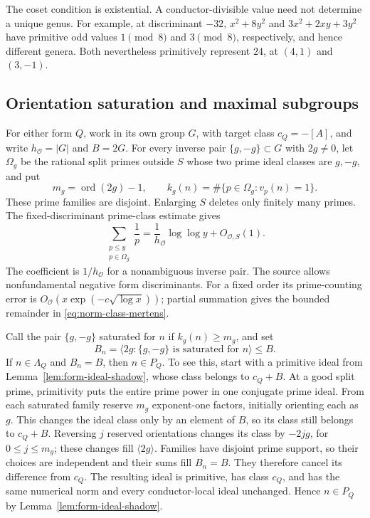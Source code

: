 The coset condition is existential. A conductor-divisible value need
not determine a unique genus. For example, at discriminant \(-32\),
\(x^2+8y^2\) and \(3x^2+2xy+3y^2\) have primitive odd values
\(1\pmod8\) and \(3\pmod8\), respectively, and hence different
genera. Both nevertheless primitively represent \(24\), at
\((4,1)\) and \((3,-1)\).

\subsection{Orientation saturation and maximal subgroups}

For either form \(Q\), work in its own group \(G\), with target
class \(c_Q=-[A]\), and write $h_{\mathcal O}=|G|$ and $B=2G$. For every inverse pair
$\{g,-g\}\subset G$ with $2g\ne0$, let
$\Omega_g$ be the rational split primes outside $S$ whose two prime
ideal classes are $g,-g$, and put
\[
 m_g=\operatorname{ord}(2g)-1,\qquad
 k_g(n)=\#\{p\in\Omega_g:v_p(n)=1\}.
\]
These prime families are disjoint. Enlarging \(S\) deletes only
finitely many primes. The fixed-discriminant prime-class
estimate \cite[Lemma~2, equation~(5.2)]{bourgainfuchs} gives
\begin{equation}\label{eq:norm-class-mertens}
 \sum_{\substack{p\le y\\p\in\Omega_g}}\frac1p
                =\frac1h_{\mathcal O}\log\log y+O_{\mathcal O,S}(1).
\end{equation}
The coefficient is $1/h_{\mathcal O}$ for a nonambiguous inverse pair.  The source
allows nonfundamental negative form discriminants.  For a fixed order
its prime-counting error is $O_{\mathcal O}(x\exp(-c\sqrt{\log x}))$;
partial summation gives the bounded remainder in
\eqref{eq:norm-class-mertens}.

Call the pair $\{g,-g\}$ saturated for $n$ if $k_g(n)\ge m_g$, and set
\[
 B_n=\langle2g:\{g,-g\}\text{ is saturated for }n\rangle\le B.
\]
If $n\in\Lambda_Q$ and $B_n=B$, then $n\in P_Q$. To see this,
start with a primitive ideal from Lemma~\ref{lem:form-ideal-shadow},
whose class belongs to $c_Q+B$. At a good split prime, primitivity puts
the entire prime power in one conjugate prime ideal. From each saturated family
reserve $m_g$ exponent-one factors, initially orienting each as $g$.
This changes the ideal class only by an element of $B$, so its class
still belongs to $c_Q+B$. Reversing $j$ reserved orientations changes
its class by $-2jg$, for $0\le j\le m_g$; these changes fill
$\langle2g\rangle$. Families have disjoint prime support, so their
choices are independent and their sums fill $B_n=B$. They therefore
cancel its difference from \(c_Q\). The resulting ideal is primitive,
has class \(c_Q\), and has the same numerical norm and every
conductor-local ideal unchanged. Hence $n\in P_Q$ by
Lemma~\ref{lem:form-ideal-shadow}.

